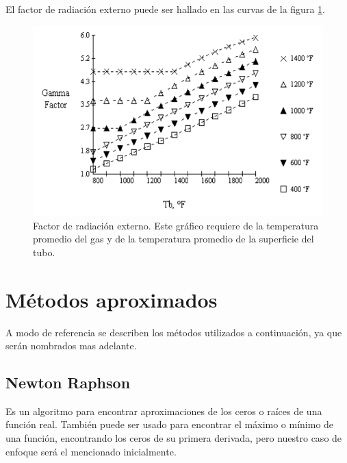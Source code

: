 El factor de radiación externo puede ser hallado en las curvas de la figura \ref{fig:gamma}.

\begin{figure}[hbt]
\begin{center}
\includegraphics[scale=0.45]{images/gamma}
\caption[Factor de radiación externo]{Factor de radiación externo. Este gráfico requiere de la temperatura promedio del gas y de la temperatura promedio de la superficie del tubo.}
\label{fig:gamma}
\end{center}
\end{figure}

\section{Métodos aproximados}
\par A modo de referencia se describen los métodos utilizados a continuación, ya que serán nombrados mas adelante.

\subsection{Newton Raphson}
\par Es un algoritmo para encontrar aproximaciones de los ceros o raíces de una función real. También puede ser usado para encontrar el máximo o mínimo de una función, encontrando los ceros de su primera derivada, pero nuestro caso de enfoque será el mencionado inicialmente.

